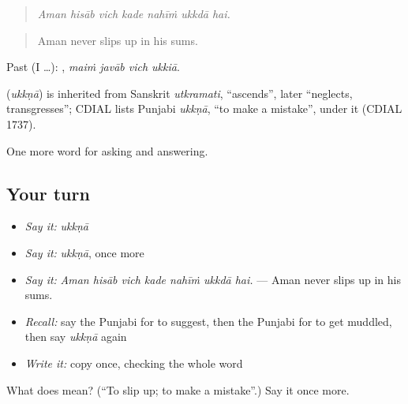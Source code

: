 \begin{quote}
      
\end{quote}

\begin{quote}
\emph{Aman hisāb vich kade nahīṁ ukkdā hai.}
\end{quote}

\begin{quote}
Aman never slips up in his sums.
\end{quote}

Past (I …):    , \emph{maiṁ javāb vich ukkiā}.

\begin{cousinweb}
\textbf{} (\emph{ukkṇā}) is inherited from Sanskrit \emph{utkramati}, \textquotedblleft{}ascends\textquotedblright{}, later \textquotedblleft{}neglects, transgresses\textquotedblright{}; CDIAL lists Punjabi \emph{ukkṇā}, \textquotedblleft{}to make a mistake\textquotedblright{}, under it (CDIAL 1737).
\end{cousinweb}

\begin{grammarlens}[title={What you've built}]
One more word for asking and answering.
\end{grammarlens}

\subsection*{Your turn}
\begin{itemize}
\raggedright
  \item \emph{Say it:} \emph{ukkṇā}
  \item \emph{Say it:} \emph{ukkṇā}, once more
  \item \emph{Say it:} \emph{Aman hisāb vich kade nahīṁ ukkdā hai.} — Aman never slips up in his sums.
  \item \emph{Recall:} say the Punjabi for to suggest, then the Punjabi for to get muddled, then say \emph{ukkṇā} again
  \item \emph{Write it:} copy \textbf{} once, checking the whole word
\end{itemize}

\begin{tcolorbox}[breakable,colback=teal!4,colframe=teal!35!black,title={Before you move on}]
What does  mean? (\textquotedblleft{}To slip up; to make a mistake\textquotedblright{}.) Say it once more.
\end{tcolorbox}

